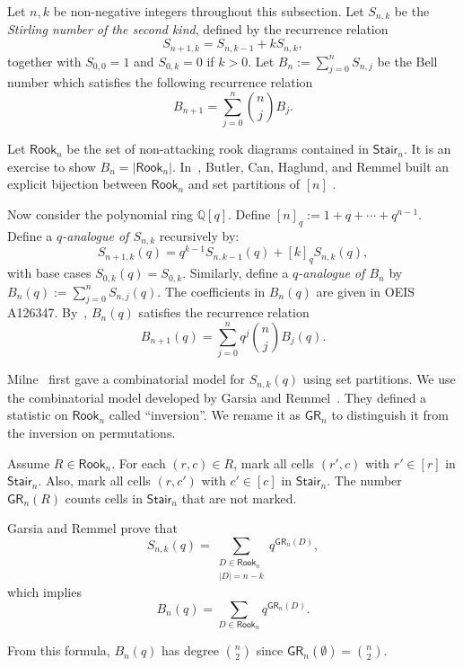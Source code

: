 \documentclass[ALCO]{cedram}
\newcommand{\Q}{\mathbb{Q}}
\newcommand{\Rook}{\mathsf{Rook}}
\newcommand{\Stair}{\mathsf{Stair}}
\newcommand{\GR}{\mathsf{GR}}
\newcommand{\definition}[1]{{\color{darkred}\emph{#1}}}
\begin{document}
Let $n, k$ be non-negative integers
throughout this subsection. 
Let $S_{n, k}$ be the \definition{Stirling number
of the second kind},
defined by the recurrence relation
$$
S_{n+1,k} = S_{n, k - 1} + k S_{n, k},
$$
together with $S_{0, 0} = 1$
and $S_{0,k} = 0$ if $k > 0$.
Let $B_n:= \sum_{j = 0}^n S_{n,j}$
be the Bell number
which satisfies the following recurrence relation
$$
B_{n + 1} = \sum_{j = 0}^n {\binom{n}{j}} B_j.
$$
 
Let $\Rook_n$ be the set 
of non-attacking rook diagrams contained 
in $\Stair_n$.
It is an exercise to show
$B_n = |\Rook_n|$.
In~\cite{BCHR},
Butler, Can, Haglund, and Remmel
built an explicit bijection between
$\Rook_n$ and set partitions of $[n]$ .

Now consider the polynomial ring $\Q[q]$.
Define $[n]_q := 1 + q + \cdots + q^{n-1}$.
Define a \definition{$q$-analogue of $S_{n,k}$} recursively by:
$$
S_{n+1, k}(q) = q^{k-1} S_{n, k-1}(q) + [k]_q S_{n, k}(q),
$$
with base cases $S_{0, k}(q) = S_{0,k}$.
Similarly, define a \definition{$q$-analogue of $B_n$} by $B_n(q) := \sum_{j = 0}^n S_{n,j}(q)$.
The coefficients in $B_{n}(q)$
are given in OEIS A126347.
By~\cite{Wa},
$B_n(q)$ satisfies the recurrence relation
$$
B_{n+1}(q) = \sum_{j = 0}^n q^j {\binom{n}{j}} B_j(q).
$$



Milne~\cite{Mil} first gave a combinatorial
model for $S_{n,k}(q)$ using set partitions. 
We use the combinatorial model
developed by Garsia and Remmel~\cite{GR}.
They defined a statistic on $\Rook_n$
called ``inversion''.
We rename it as $\GR_n$ to distinguish it 
from the inversion on permutations. 
\begin{defn}[\cite{GR}]
Assume $R \in \Rook_n$.
For each $(r,c) \in R$,
mark all cells $(r', c)$ with $r' \in [r]$ in $\Stair_n$.
Also, mark all cells $(r, c')$ with $c' \in [c]$ in $\Stair_n$.
The number $\GR_n(R)$ counts cells in $\Stair_n$
that are not marked. 
\end{defn}

Garsia and Remmel prove that
\begin{equation}
\label{EQ: GR Stirling}
S_{n,k}(q) = \sum_{\substack{D \in \Rook_{n}\\ |D| = n-k}} q^{\GR_n(D)},
\end{equation}
which implies
\begin{equation}
\label{EQ: GR Bell}
B_n(q) = \sum_{D \in \Rook_n} q^{\GR_n(D)}.
\end{equation}

From this formula, $B_n(q)$ has degree ${\binom{n}{2}}$
since $\GR_n(\emptyset) = {\binom{n}{2}}$.
\end{document}
